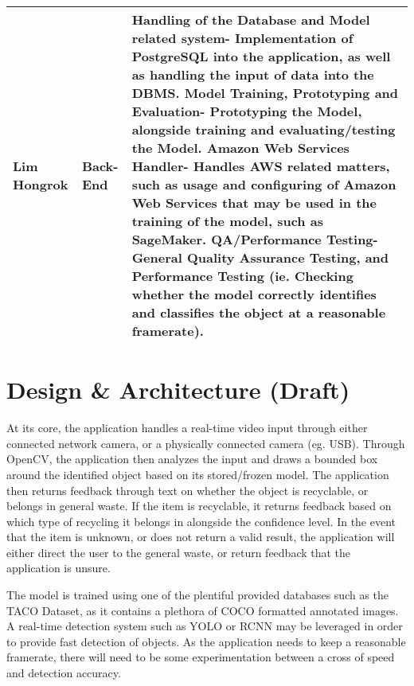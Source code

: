\documentclass[conference]{IEEEtran}
\begin{document}
\begin{table}[htbp]
\begin{tabular}{|p{1.5cm}|p{1.5cm}|p{4.7cm}|}
Lim Hongrok & Back-End & 
\newline Handling of the Database and Model related system\newline- Implementation of PostgreSQL into the application, as well as handling the input of data into the DBMS.
\newline 
\newline Model Training, Prototyping and Evaluation\newline- Prototyping the Model, alongside training and evaluating/testing the Model.
\newline 
\newline Amazon Web Services Handler\newline- Handles AWS related matters, such as usage and configuring of Amazon Web Services that may be used in the training of the model, such as SageMaker.
\newline 
\newline QA/Performance Testing\newline- General Quality Assurance Testing, and Performance Testing (ie. Checking whether the model correctly identifies and classifies the object at a reasonable framerate).
\\ \hline
\end{tabular}
\end{table}

\newpage

\section{Design \& Architecture (Draft)}
At its core, the application handles a real-time video input through either connected network camera, or a physically connected camera (eg. USB). Through OpenCV, the application then analyzes the input and draws a bounded box around the identified object based on its stored/frozen model. The application then returns feedback through text on whether the object is recyclable, or belongs in general waste. If the item is recyclable, it returns feedback based on which type of recycling it belongs in alongside the confidence level. In the event that the item is unknown, or does not return a valid result, the application will either direct the user to the general waste, or return feedback that the application is unsure.

The model is trained using one of the plentiful provided databases such as the TACO Dataset, as it contains a plethora of COCO formatted annotated images. A real-time detection system such as YOLO or RCNN may be leveraged in order to provide fast detection of objects. As the application needs to keep a reasonable framerate, there will need to be some experimentation between a cross of speed and detection accuracy.
\end{document}
